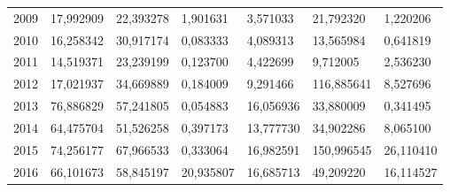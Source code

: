 \begin{table}
\begin{tabular}{p{1cm}p{2cm}p{2cm}p{2cm}p{2cm}p{2cm}p{2cm}}
 2009 &                17,992909 &                                    22,393278 &                        1,901631 &                                3,571033 &                     21,792320 &            1,220206 \\
 2010 &                16,258342 &                                    30,917174 &                        0,083333 &                                4,089313 &                     13,565984 &            0,641819 \\
 2011 &                14,519371 &                                    23,239199 &                        0,123700 &                                4,422699 &                      9,712005 &            2,536230 \\
 2012 &                17,021937 &                                    34,669889 &                        0,184009 &                                9,291466 &                    116,885641 &            8,527696 \\
 2013 &                76,886829 &                                    57,241805 &                        0,054883 &                               16,056936 &                     33,880009 &            0,341495 \\
 2014 &                64,475704 &                                    51,526258 &                        0,397173 &                               13,777730 &                     34,902286 &            8,065100 \\
 2015 &                74,256177 &                                    67,966533 &                        0,333064 &                               16,982591 &                    150,996545 &           26,110410 \\
 2016 &                66,101673 &                                    58,845197 &                       20,935807 &                               16,685713 &                     49,209220 &           16,114527 \\
\bottomrule
\end{tabular}
\end{table}
